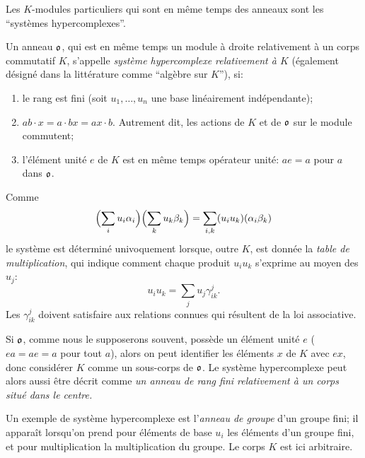 Les $K$-modules particuliers qui sont en même temps des anneaux sont les ``systèmes hypercomplexes''.

Un anneau $\mathfrak{o}$, qui est en même temps un module à droite relativement à un corps commutatif $K$, s'appelle \emph{système hypercomplexe relativement à $K$} (également désigné dans la littérature comme ``algèbre sur $K$''), si:
\begin{enumerate}
\item le rang est fini (soit $u_1,\ldots,u_n$ une base linéairement indépendante);
\item $ab\cdot x=a\cdot bx=ax\cdot b$. Autrement dit, les actions de $K$ et de $\mathfrak{o}$ sur le module commutent;
\item l'élément unité $e$ de $K$ est en même temps opérateur unité: $ae=a$ pour $a$ dans $\mathfrak{o}$.
\end{enumerate}
Comme
\[
        \Bigl(\sum_i u_i\alpha_i\Bigr)\Bigl(\sum_k u_k\beta_k\Bigr)
        =\sum_{i,k}(u_i u_k)(\alpha_i\beta_k)
\]
le système est déterminé univoquement lorsque, outre $K$, est donnée la \emph{table de multiplication}, qui indique comment chaque produit $u_i u_k$ s'exprime au moyen des $u_j$:
\[
        u_i u_k=\sum_j u_j\gamma^j_{ik}.
\]
Les $\gamma^j_{ik}$ doivent satisfaire aux relations connues qui résultent de la loi associative.

Si $\mathfrak{o}$, comme nous le supposerons souvent, possède un élément unité $e$ ($ea=ae=a$ pour tout $a$), alors on peut identifier les éléments $x$ de $K$ avec $ex$, donc considérer $K$ comme un sous-corps de $\mathfrak{o}$. Le système hypercomplexe peut alors aussi être décrit comme \emph{un anneau de rang fini relativement à un corps situé dans le centre.}

Un exemple de système hypercomplexe est l'\emph{anneau de groupe} d'un groupe fini; il apparaît lorsqu'on prend pour éléments de base $u_i$ les éléments d'un groupe fini, et pour multiplication la multiplication du groupe. Le corps $K$ est ici arbitraire.

